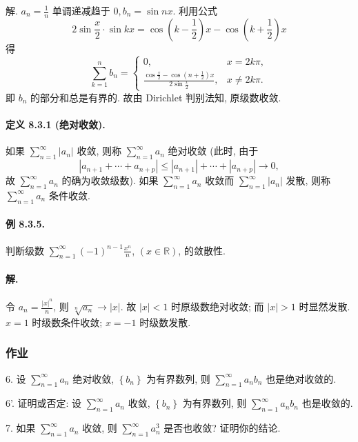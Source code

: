 解. $a_{n}=\frac{1}{n}$ 单调递减趋于 $0,b_{n}=\sin nx$. 利用公式 
\[
2\sin\frac{x}{2}\cdot\sin kx=\cos\left(k-\frac{1}{2}\right)x-\cos\left(k+\frac{1}{2}\right)x
\]
得 
\[
\sum_{k=1}^{n}b_{n}=\begin{cases}
0, & x=2k\pi,\\
\frac{\cos\frac{x}{2}-\cos\left(n+\frac{1}{2}\right)x}{2\sin\frac{x}{2}}, & x\neq2k\pi.
\end{cases}
\]
即 $b_{n}$ 的部分和总是有界的. 故由 Dirichlet 判别法知, 原级数收敛.

\paragraph{定义 8.3.1 (绝对收敛). }

如果 $\sum_{n=1}^{\infty}\left|a_{n}\right|$ 收敛, 则称 $\sum_{n=1}^{\infty}a_{n}$
绝对收敛 (此时, 由于 
\[
\left|a_{n+1}+\cdots+a_{n+p}\right|\leqslant\left|a_{n+1}\right|+\cdots+\left|a_{n+p}\right|\rightarrow0,
\]
故 $\sum_{n=1}^{\infty}a_{n}$ 的确为收敛级数). 如果 $\sum_{n=1}^{\infty}a_{n}$
收敛而 $\sum_{n=1}^{\infty}\left|a_{n}\right|$ 发散, 则称 $\sum_{n=1}^{\infty}a_{n}$
条件收敛.

\paragraph{例 8.3.5. }

判断级数 $\sum_{n=1}^{\infty}(-1)^{n-1}\frac{x^{n}}{n}$, $(x\in\mathbb{R})$,
的敛散性. 

\paragraph{解. }

令 $a_{n}=\frac{|x|^{n}}{n}$, 则 $\sqrt[n]{a_{n}}\rightarrow|x|$.
故 $|x|<1$ 时原级数绝对收敛; 而 $|x|>1$ 时显然发散. $x=1$ 时级数条件收敛; $x=-1$ 时级数发散.

\subsubsection{作业}

6. 设 $\sum_{n=1}^{\infty}a_{n}$ 绝对收敛, $\left\{ b_{n}\right\} $ 为有界数列,
则 $\sum_{n=1}^{\infty}a_{n}b_{n}$ 也是绝对收敛的. 

6'. 证明或否定: 设 $\sum_{n=1}^{\infty}a_{n}$ 收敛, $\left\{ b_{n}\right\} $
为有界数列, 则 $\sum_{n=1}^{\infty}a_{n}b_{n}$ 也是收敛的. 

7. 如果 $\sum_{n=1}^{\infty}a_{n}$ 收敛, 则 $\sum_{n=1}^{\infty}a_{n}^{3}$
是否也收敛? 证明你的结论. 

